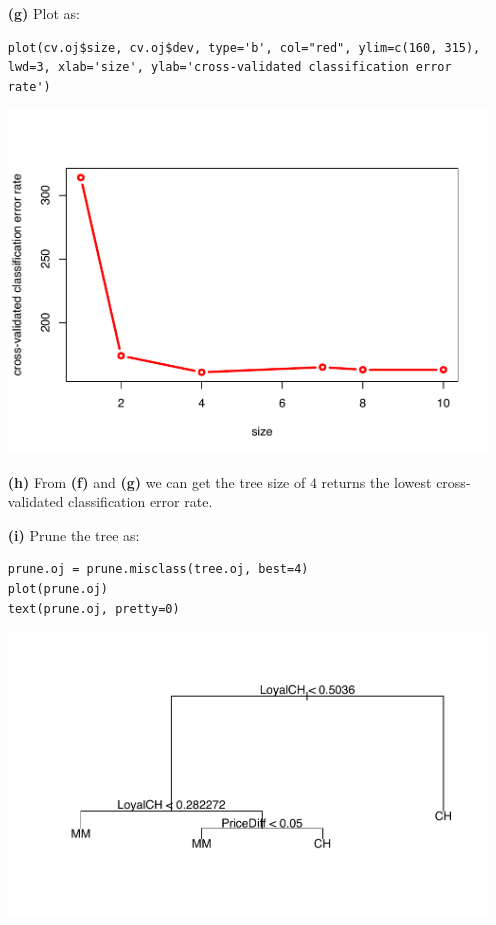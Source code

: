 \documentclass[twoside,11pt]{homework}
\begin{document}
\begin{enumerate}
\item[\textbf{(g)}] Plot as:

\begin{lstlisting}
plot(cv.oj$size, cv.oj$dev, type='b', col="red", ylim=c(160, 315), lwd=3, xlab='size', ylab='cross-validated classification error rate')
\end{lstlisting}

\begin{center}
\includegraphics[height=0.35\textheight]{g2.pdf}
\end{center}


\item[\textbf{(h)}] From \textbf{(f)} and \textbf{(g)} we can get the tree size of $4$ returns the lowest cross-validated classification error rate.

\item[\textbf{(i)}] Prune the tree as:

\begin{lstlisting}
prune.oj = prune.misclass(tree.oj, best=4)
plot(prune.oj)
text(prune.oj, pretty=0)
\end{lstlisting}

\begin{center}
\includegraphics[height=0.35\textheight]{g3.pdf}
\end{center}



\end{enumerate}
\end{document}
